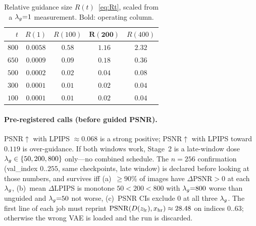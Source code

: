 \begin{table}[htbp]
  \centering
  \caption{Relative guidance size $R(t)$~\eqref{eq:Rt}, scaled from
  a $\lambda_{g}{=}1$ measurement. Bold: operating column.}
  \label{tab:Rt}
  \small
  \begin{tabular}{@{}rcccc@{}}
    \toprule
    $t$ & $R(1)$ & $R(100)$ & $\mathbf{R(200)}$ & $R(400)$ \\
    \midrule
    $800$ & $0.0058$ & $0.58$ & $\mathbf{1.16}$ & $2.32$ \\
    $650$ & $0.0009$ & $0.09$ & $\mathbf{0.18}$ & $0.36$ \\
    $500$ & $0.0002$ & $0.02$ & $\mathbf{0.04}$ & $0.08$ \\
    $300$ & $0.0001$ & $0.01$ & $\mathbf{0.02}$ & $0.04$ \\
    $100$ & $0.0001$ & $0.01$ & $\mathbf{0.02}$ & $0.04$ \\
    \bottomrule
  \end{tabular}
\end{table}

\paragraph{Pre-registered calls (before guided PSNR).}
PSNR$\uparrow$ with LPIPS $\approx 0.068$ is a strong positive;
PSNR$\uparrow$ with LPIPS toward $0.119$ is over-guidance.
If both windows work, Stage~2 is a late-window dose
$\lambda_{g}\in\{50,200,800\}$ only---no combined schedule.
The $n{=}256$ confirmation (val\_index $0..255$, same checkpoints,
late window) is declared before looking at those numbers, and
survives iff (a)~$\ge 90\%$ of images have $\Delta\mathrm{PSNR}>0$ at
each $\lambda_{g}$, (b)~mean $\Delta$LPIPS is monotone
$50<200<800$ with $\lambda_{g}{=}800$ worse than unguided and
$\lambda_{g}{=}50$ not worse, (c)~PSNR CIs exclude $0$ at all three
$\lambda_{g}$.
The first line of each job must reprint
$\mathrm{PSNR}(D(z_{\mathrm{lr}}),x_{\mathrm{hr}})\approx 28.48$ on indices $0..63$;
otherwise the wrong VAE is loaded and the run is discarded.
